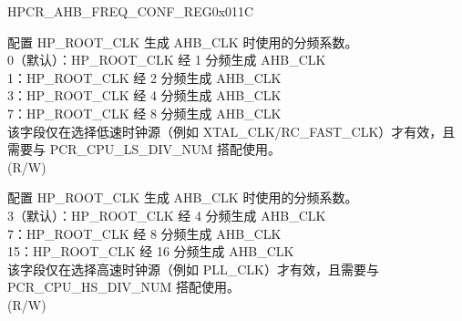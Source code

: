 \begin{register}{H}{PCR\_AHB\_FREQ\_CONF\_REG}{0x011C}\label{regdesc:PCRAHBFREQCONFREG}
%
%
%
\regnewline%
\begin{regdesc}\begin{reglist}
\label{fielddesc:PCRAHBLSDIVNUM}\item [PCR\_AHB\_LS\_DIV\_NUM] 配置 HP\_ROOT\_CLK 生成 AHB\_CLK 时使用的分频系数。\\
0（默认）：HP\_ROOT\_CLK 经 1 分频生成 AHB\_CLK \\
1：HP\_ROOT\_CLK 经 2 分频生成 AHB\_CLK\\
3：HP\_ROOT\_CLK 经 4 分频生成 AHB\_CLK\\
7：HP\_ROOT\_CLK 经 8 分频生成 AHB\_CLK\\
该字段仅在选择低速时钟源（例如 XTAL\_CLK/RC\_FAST\_CLK）才有效，且需要与 PCR\_CPU\_LS\_DIV\_NUM 搭配使用。 \\ (R/W)
\label{fielddesc:PCRAHBHSDIVNUM}\item [PCR\_AHB\_HS\_DIV\_NUM] 配置 HP\_ROOT\_CLK 生成 AHB\_CLK 时使用的分频系数。\\
3（默认）：HP\_ROOT\_CLK 经 4 分频生成 AHB\_CLK \\
7：HP\_ROOT\_CLK 经 8 分频生成 AHB\_CLK \\
15：HP\_ROOT\_CLK 经 16 分频生成 AHB\_CLK \\
该字段仅在选择高速时钟源（例如 PLL\_CLK）才有效，且需要与 PCR\_CPU\_HS\_DIV\_NUM 搭配使用。\\
(R/W)
\end{reglist}\end{regdesc}
\end{register}


